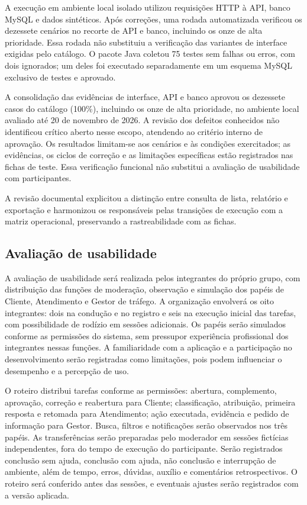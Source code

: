 A execução em ambiente local isolado utilizou requisições HTTP à API, banco MySQL e dados sintéticos. Após correções, uma rodada automatizada verificou os dezessete cenários no recorte de API e banco, incluindo os onze de alta prioridade. Essa rodada não substituiu a verificação das variantes de interface exigidas pelo catálogo. O pacote Java coletou 75 testes sem falhas ou erros, com dois ignorados; um deles foi executado separadamente em um esquema MySQL exclusivo de testes e aprovado.

A consolidação das evidências de interface, API e banco aprovou os dezessete casos do catálogo (100\%), incluindo os onze de alta prioridade, no ambiente local avaliado até 20 de novembro de 2026. A revisão dos defeitos conhecidos não identificou crítico aberto nesse escopo, atendendo ao critério interno de aprovação. Os resultados limitam-se aos cenários e às condições exercitados; as evidências, os ciclos de correção e as limitações específicas estão registrados nas fichas de teste. Essa verificação funcional não substitui a avaliação de usabilidade com participantes.

A revisão documental explicitou a distinção entre consulta de lista, relatório e exportação e harmonizou os responsáveis pelas transições de execução com a matriz operacional, preservando a rastreabilidade com as fichas.

\subsection{\esp Avaliação de usabilidade}

A avaliação de usabilidade será realizada pelos integrantes do próprio grupo, com distribuição das funções de moderação, observação e simulação dos papéis de Cliente, Atendimento e Gestor de tráfego. A organização envolverá os oito integrantes: dois na condução e no registro e seis na execução inicial das tarefas, com possibilidade de rodízio em sessões adicionais. Os papéis serão simulados conforme as permissões do sistema, sem pressupor experiência profissional dos integrantes nessas funções. A familiaridade com a aplicação e a participação no desenvolvimento serão registradas como limitações, pois podem influenciar o desempenho e a percepção de uso.

O roteiro distribui tarefas conforme as permissões: abertura, complemento, aprovação, correção e reabertura para Cliente; classificação, atribuição, primeira resposta e retomada para Atendimento; ação executada, evidência e pedido de informação para Gestor. Busca, filtros e notificações serão observados nos três papéis. As transferências serão preparadas pelo moderador em sessões fictícias independentes, fora do tempo de execução do participante. Serão registrados conclusão sem ajuda, conclusão com ajuda, não conclusão e interrupção de ambiente, além de tempo, erros, dúvidas, auxílio e comentários retrospectivos. O roteiro será conferido antes das sessões, e eventuais ajustes serão registrados com a versão aplicada.

